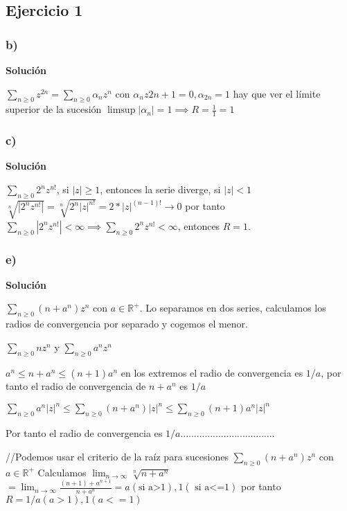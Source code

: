 \subsection{Ejercicio 1}
\subsubsection{b)}


\textbf{Solución}

$\sum_{n\geq 0} z^{2n} = \sum_{n\geq 0} \alpha_nz^n$
con $\alpha_nz{2n+1} =0, \alpha_{2n} = 1$
hay que ver el límite superior de la sucesión
$\limsup |\alpha_n| = 1 \implies R=\frac{1}{1} = 1$

\subsubsection{c)}

\textbf{Solución}

$\sum_{n\geq 0} 2^nz^{n!}$,
si $|z|\geq 1$, entonces la serie diverge, 
si $|z|<1$
$\sqrt[n]{|2^nz^{n!}|} = \sqrt[n]{2^n|z|^{n!}} = 2*|z|^{(n-1)!} \rightarrow 0$
por tanto
$\sum_{n\geq 0} |2^nz^{n!}| < \infty \implies \sum_{n\geq 0} 2^nz^{n!} < \infty$, entonces $R=1$.

\subsubsection{e)}

\textbf{Solución}

$\sum_{n\geq 0} (n+a^n)z^n$ con $a\in\mathbb{R}^+$.
Lo separamos en dos series, calculamos los radios de convergencia por separado y cogemos el menor.

$\sum_{n\geq 0} nz^n$ y $\sum_{n\geq 0} a^nz^n$

$a^n \leq n+a^n \leq (n+1)a^n$
en los extremos el radio de convergencia es $1/a$, por tanto el radio de convergencia de $n+a^n$ es $1/a$

$\sum_{n\geq 0} a^n |z|^n \leq \sum_{n\geq 0} (n+a^n)|z|^n \leq \sum_{n\geq 0} (n+1)a^n|z|^n$

Por tanto el radio de convergencia es $1/a$...................................

//Podemos usar el criterio de la raíz para sucesiones 
$\sum_{n\geq 0} (n+a^n)z^n$ con $a\in\mathbb{R}^+$
Calculamos $\lim_{n\rightarrow\infty} \sqrt[n]{n+a^n}$
$ = \lim_{n\rightarrow\infty} \frac{(n+1)+a^{n+1}}{n+a^n} = a (\text{si a>1}), 1 (\text{ si a<=1})$
por tanto
$R = 1/a (a>1), 1 (a<=1)$

